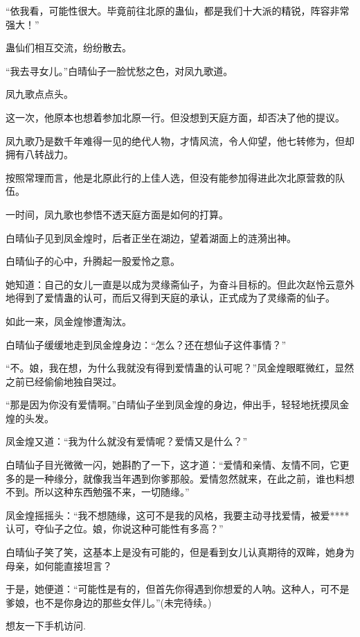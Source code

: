 \begin{this_body}
“依我看，可能性很大。毕竟前往北原的蛊仙，都是我们十大派的精锐，阵容非常强大！”

蛊仙们相互交流，纷纷散去。

“我去寻女儿。”白晴仙子一脸忧愁之色，对凤九歌道。

凤九歌点点头。

这一次，他原本也想着参加北原一行。但没想到天庭方面，却否决了他的提议。

凤九歌乃是数千年难得一见的绝代人物，才情风流，令人仰望，他七转修为，但却拥有八转战力。

按照常理而言，他是北原此行的上佳人选，但没有能参加得进此次北原营救的队伍。

一时间，凤九歌也参悟不透天庭方面是如何的打算。

白晴仙子见到凤金煌时，后者正坐在湖边，望着湖面上的涟漪出神。

白晴仙子的心中，升腾起一股爱怜之意。

她知道：自己的女儿一直是以成为灵缘斋仙子，为奋斗目标的。但此次赵怜云意外地得到了爱情蛊的认可，而后又得到天庭的承认，正式成为了灵缘斋的仙子。

如此一来，凤金煌惨遭淘汰。

白晴仙子缓缓地走到凤金煌身边：“怎么？还在想仙子这件事情？”

“不。娘，我在想，为什么我就没有得到爱情蛊的认可呢？”凤金煌眼眶微红，显然之前已经偷偷地独自哭过。

“那是因为你没有爱情啊。”白晴仙子坐到凤金煌的身边，伸出手，轻轻地抚摸凤金煌的头发。

凤金煌又道：“我为什么就没有爱情呢？爱情又是什么？”

白晴仙子目光微微一闪，她斟酌了一下，这才道：“爱情和亲情、友情不同，它更多的是一种缘分，就像我当年遇到你爹那般。爱情忽然就来，在此之前，谁也料想不到。所以这种东西勉强不来，一切随缘。”

凤金煌摇摇头：“我不想随缘，这可不是我的风格，我要主动寻找爱情，被爱****认可，夺仙子之位。娘，你说这种可能性有多高？”

白晴仙子笑了笑，这基本上是没有可能的，但是看到女儿认真期待的双眸，她身为母亲，如何能直接坦言？

于是，她便道：“可能性是有的，但首先你得遇到你想爱的人呐。这种人，可不是爹娘，也不是你身边的那些女伴儿。”(未完待续。)

想友一下手机访问.

\end{this_body}

